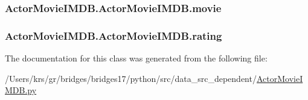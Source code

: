 \subsubsection[{movie}]{\setlength{\rightskip}{0pt plus 5cm}Actor\+Movie\+I\+M\+D\+B.\+Actor\+Movie\+I\+M\+D\+B.\+movie}\label{class_actor_movie_i_m_d_b_1_1_actor_movie_i_m_d_b_a6bd3b1b0d77e5d64e30f693b70a82285}
\hypertarget{class_actor_movie_i_m_d_b_1_1_actor_movie_i_m_d_b_a46719008afa7ca424dd1f190d92f98d6}{}
\subsubsection[{rating}]{\setlength{\rightskip}{0pt plus 5cm}Actor\+Movie\+I\+M\+D\+B.\+Actor\+Movie\+I\+M\+D\+B.\+rating}\label{class_actor_movie_i_m_d_b_1_1_actor_movie_i_m_d_b_a46719008afa7ca424dd1f190d92f98d6}


The documentation for this class was generated from the following file\+:\begin{DoxyCompactItemize}
\item 
/\+Users/krs/gr/bridges/bridges17/python/src/data\+\_\+src\+\_\+dependent/\hyperlink{_actor_movie_i_m_d_b_8py}{Actor\+Movie\+I\+M\+D\+B.\+py}\end{DoxyCompactItemize}
